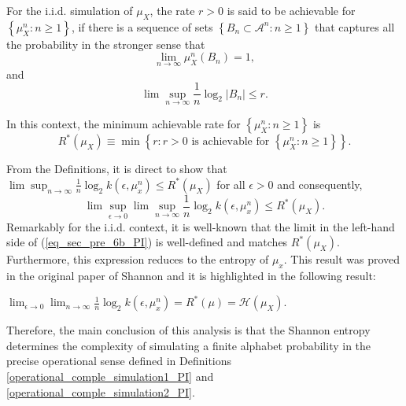 \begin{definition}
	\label{def_minimum_ach_rate_PI}
	For the i.i.d. simulation of $\mu_X$, the rate $r>0$ is said to be achievable for $\left\{\mu_X^n: n\geq 1\right\}$, if there is a sequence of sets $\left\{ B_n\subset \mathcal{A}^n: n\geq 1 \right\}$ that captures all the probability %
	in the stronger sense that
	\begin{equation*}%
		\lim_{n \rightarrow \infty} \mu_X^n(B_n)=1,
	\end{equation*}
	and 
	\begin{equation*}
		\lim\sup_{n \rightarrow \infty} \frac{1}{n}\log_2  \left| B_n \right| \leq r.
	\end{equation*}
\end{definition}
\begin{definition} \label{operational_comple_simulation2_PI}
	In this context, the minimum achievable  rate for $\left\{\mu_X^n: n\geq 1\right\}$ is 
	\begin{equation*}
		R^*(\mu_X) \equiv \min \left\{r: \text{$r>0$ is achievable for  $\left\{\mu_X^n: n\geq 1\right\}$}\right\}.
	\end{equation*}
\end{definition}
From the Definitions,  it is direct to show that  $ \lim\sup_{n \longrightarrow \infty} \frac{1}{n} \log_2 k(\epsilon, \mu^n_x)  \leq  R^*(\mu_X)$ for all $\epsilon>0$ and consequently, 
\begin{equation}\label{eq_sec_pre_6b_PI}
	\lim\sup_{\epsilon \longrightarrow 0}\lim\sup_{n \longrightarrow \infty} \frac{1}{n} \log_2 k(\epsilon, \mu^n_x) \leq  R^*(\mu_X).
 \end{equation}
Remarkably for the i.i.d. context,  it is well-known that the limit in the left-hand side of (\ref{eq_sec_pre_6b_PI}) is well-defined and matches  $R^*(\mu_X)$. Furthermore, this expression reduces to the entropy of $\mu_x$. This result was proved in the original paper of Shannon \citep{shannon_1948} and it is highlighted in the following result:
\begin{theorem} \citep{shannon_1948}
\label{th_entropy_simulations_PI}
		$\lim_{\epsilon \longrightarrow 0}\lim_{n \longrightarrow \infty} \frac{1}{n} \log_2 k(\epsilon, \mu^n_x) =R^*(\mu)= \mathcal{H}(\mu_X).$
\end{theorem}
Therefore, the main conclusion of this analysis is that the Shannon entropy determines the complexity of simulating a finite alphabet 
probability in the precise operational sense defined in Definitions \ref{operational_comple_simulation1_PI}  and \ref{operational_comple_simulation2_PI}.


